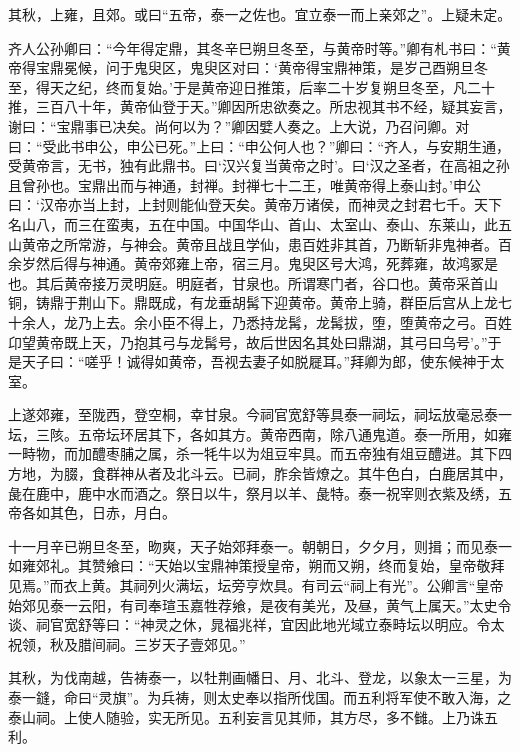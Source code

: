 \documentclass[12pt,UTF8]{ctexbook}
\begin{document}
其秋，上雍，且郊。或曰“五帝，泰一之佐也。宜立泰一而上亲郊之”。上疑未定。



齐人公孙卿曰：“今年得定鼎，其冬辛巳朔旦冬至，与黄帝时等。”卿有札书曰：“黄帝得宝鼎冕候，问于鬼臾区，鬼臾区对曰：‘黄帝得宝鼎神策，是岁己酉朔旦冬至，得天之纪，终而复始。’于是黄帝迎日推策，后率二十岁复朔旦冬至，凡二十推，三百八十年，黄帝仙登于天。”卿因所忠欲奏之。所忠视其书不经，疑其妄言，谢曰：“宝鼎事已决矣。尚何以为？”卿因嬖人奏之。上大说，乃召问卿。对曰：“受此书申公，申公已死。”上曰：“申公何人也？”卿曰：“齐人，与安期生通，受黄帝言，无书，独有此鼎书。曰‘汉兴复当黄帝之时’。曰‘汉之圣者，在高祖之孙且曾孙也。宝鼎出而与神通，封禅。封禅七十二王，唯黄帝得上泰山封。’申公曰：‘汉帝亦当上封，上封则能仙登天矣。黄帝万诸侯，而神灵之封君七千。天下名山八，而三在蛮夷，五在中国。中国华山、首山、太室山、泰山、东莱山，此五山黄帝之所常游，与神会。黄帝且战且学仙，患百姓非其首，乃断斩非鬼神者。百余岁然后得与神通。黄帝郊雍上帝，宿三月。鬼臾区号大鸿，死葬雍，故鸿冢是也。其后黄帝接万灵明庭。明庭者，甘泉也。所谓寒门者，谷口也。黄帝采首山铜，铸鼎于荆山下。鼎既成，有龙垂胡髯下迎黄帝。黄帝上骑，群臣后宫从上龙七十余人，龙乃上去。余小臣不得上，乃悉持龙髯，龙髯拔，堕，堕黄帝之弓。百姓卬望黄帝既上天，乃抱其弓与龙髯号，故后世因名其处曰鼎湖，其弓曰乌号’。”于是天子曰：“嗟乎！诚得如黄帝，吾视去妻子如脱屣耳。”拜卿为郎，使东候神于太室。



上遂郊雍，至陇西，登空桐，幸甘泉。今祠官宽舒等具泰一祠坛，祠坛放毫忌泰一坛，三陔。五帝坛环居其下，各如其方。黄帝西南，除八通鬼道。泰一所用，如雍一畤物，而加醴枣脯之属，杀一牦牛以为俎豆牢具。而五帝独有俎豆醴进。其下四方地，为腏，食群神从者及北斗云。已祠，胙余皆燎之。其牛色白，白鹿居其中，彘在鹿中，鹿中水而酒之。祭日以牛，祭月以羊、彘特。泰一祝宰则衣紫及绣，五帝各如其色，日赤，月白。



十一月辛已朔旦冬至，昒爽，天子始郊拜泰一。朝朝日，夕夕月，则揖；而见泰一如雍郊礼。其赞飨曰：“天始以宝鼎神策授皇帝，朔而又朔，终而复始，皇帝敬拜见焉。”而衣上黄。其祠列火满坛，坛旁亨炊具。有司云“祠上有光”。公卿言“皇帝始郊见泰一云阳，有司奉瑄玉嘉牲荐飨，是夜有美光，及昼，黄气上属天。”太史令谈、祠官宽舒等曰：“神灵之休，晁福兆祥，宜因此地光域立泰畤坛以明应。令太祝领，秋及腊间祠。三岁天子壹郊见。”



其秋，为伐南越，告祷泰一，以牡荆画幡日、月、北斗、登龙，以象太一三星，为泰一鏠，命曰“灵旗”。为兵祷，则太史奉以指所伐国。而五利将军使不敢入海，之泰山祠。上使人随验，实无所见。五利妄言见其师，其方尽，多不雠。上乃诛五利。
\end{document}
